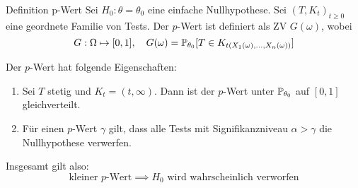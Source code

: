 \begin{mainbox}{Definition p-Wert}
	Sei \(H_0: \theta = \theta_0\) eine einfache Nullhypothese. Sei \((T, K_t)_{t\ge 0}\) eine geordnete Familie von Tests. Der \(p\)-Wert ist definiert als ZV \(G(\omega)\), wobei
	\[G: \Omega \mapsto [0,1], \quad G(\omega) = \P_{\theta_0}[T \in K_{t(X_1(\omega), ..., X_n(\omega))}]\]
\end{mainbox}
Der \(p\)-Wert hat folgende Eigenschaften:
\begin{enumerate}
	\item Sei \(T\) stetig und \(K_t = (t, \infty)\). Dann ist der \(p\)-Wert unter \(\P_{\theta_0}\) auf \([0,1]\) gleichverteilt.
	\item Für einen \(p\)-Wert \(\gamma\) gilt, dass alle Tests mit Signifikanzniveau \(\alpha > \gamma\) die Nullhypothese verwerfen.
\end{enumerate}

Insgesamt gilt also:
\[\text{kleiner } p\text{-Wert} \implies H_0 \text{ wird wahrscheinlich verworfen} \]

